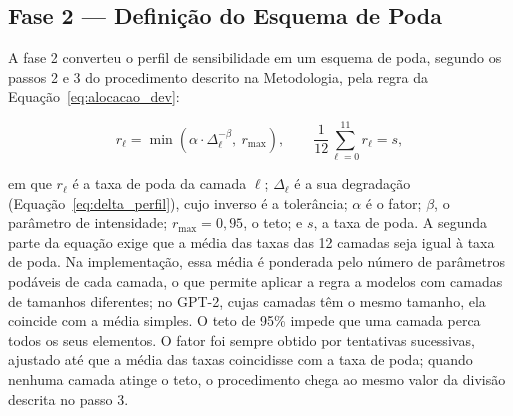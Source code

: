 \subsection{Fase 2 --- Definição do Esquema de Poda}\label{subsec:fase2}

A fase 2 converteu o perfil de sensibilidade em um esquema de poda, segundo os passos 2 e 3
do procedimento descrito na Metodologia, pela regra da
Equação~\ref{eq:alocacao_dev}:

\begin{equation}\label{eq:alocacao_dev}
r_{\ell} = \min\!\left(\alpha \cdot \Delta_{\ell}^{-\beta},\ r_{\max}\right),
\qquad
\frac{1}{12}\sum_{\ell=0}^{11} r_{\ell} = s,
\end{equation}

\noindent em que $r_{\ell}$ é a taxa de poda da camada $\ell$; $\Delta_{\ell}$ é a sua
degradação (Equação~\ref{eq:delta_perfil}), cujo inverso é a tolerância; $\alpha$ é o fator;
$\beta$, o parâmetro de intensidade; $r_{\max} = 0{,}95$, o teto; e $s$, a taxa de poda. A
segunda parte da equação exige que a média das taxas das 12 camadas seja igual à taxa de
poda. Na implementação, essa média é ponderada pelo número de parâmetros podáveis de cada
camada, o que permite aplicar a regra a modelos com camadas de tamanhos diferentes; no
GPT-2, cujas camadas têm o mesmo tamanho, ela coincide com a média simples. O teto de 95\%
impede que uma camada perca todos os seus elementos. O fator foi sempre obtido por
tentativas sucessivas, ajustado até que a média das taxas coincidisse com a taxa de poda;
quando nenhuma camada atinge o teto, o procedimento chega ao mesmo valor da divisão descrita
no passo 3.

